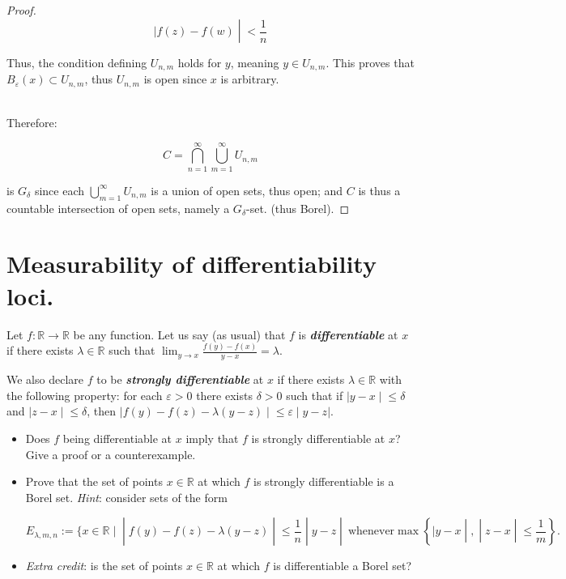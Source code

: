 \begin{proof}
\[\left. |f(z) - f(w) \middle| < \frac{1}{n} \right.\]

Thus, the condition defining \(U_{n,m}\) holds for \(y\), meaning \(y \in U_{n,m}\). This proves that \(B_{\varepsilon}(x) \subset U_{n,m}\), thus \(U_{n,m}\) is open since \(x\) is arbitrary.\\
\strut \\
Therefore:

\[C = \bigcap\limits_{n = 1}^{\infty}\bigcup\limits_{m = 1}^{\infty}U_{n,m}\]

is \(G_{\delta}\) since each \(\bigcup_{m = 1}^{\infty}U_{n,m}\) is a union of open sets, thus open; and \(C\) is thus a countable intersection of open sets, namely a \(G_{\delta}\)-set. (thus Borel).

\end{proof}

\section{Measurability of differentiability loci.}

Let \(f:\mathbb{R}\rightarrow\mathbb{R}\) be any function. Let us say (as usual) that \(f\) is \textbf{\emph{differentiable}} at \(x\) if there exists \(\lambda \in \mathbb{R}\) such that \(\lim_{y\rightarrow x}\frac{f(y) - f(x)}{y - x} = \lambda\).

We also declare \(f\) to be \textbf{\emph{strongly differentiable}} at \(x\) if there exists \(\lambda \in \mathbb{R}\) with the following property: for each \(\varepsilon > 0\) there exists \(\delta > 0\) such that if \(\left. |y - x \middle| \leq \delta \right.\) and \(\left. |z - x \middle| \leq \delta \right.\), then \(\left. |f(y) - f(z) - \lambda(y - z) \middle| \leq \varepsilon \middle| y - z| \right.\).

\begin{itemize}
\item
  Does \(f\) being differentiable at \(x\) imply that \(f\) is strongly differentiable at \(x\)? Give a proof or a counterexample.
\item
  Prove that the set of points \(x \in \mathbb{R}\) at which \(f\) is strongly differentiable is a Borel set. \emph{Hint}: consider sets of the form

  \[\left. E_{\lambda,m,n} := \{ x \in \mathbb{R} \mid \middle| f(y) - f(z) - \lambda(y - z) \middle| \leq \frac{1}{n} \middle| y - z \middle| \ \text{whenever}\max\left\{ |y - x \middle| , \middle| z - x \middle| \leq \frac{1}{m} \right\}. \right.\]
\item
  \emph{Extra credit}: is the set of points \(x \in \mathbb{R}\) at which \(f\) is differentiable a Borel set?
\end{itemize}


